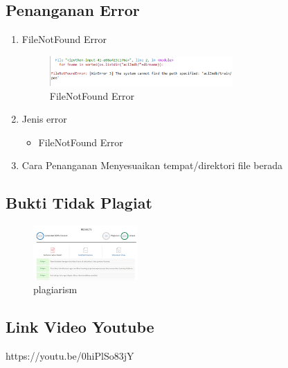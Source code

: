 \subsection{Penanganan Error}
\begin{enumerate}
	\item FileNotFound Error
	\hfill\break
		\begin{figure}[H]
			\includegraphics[width=7cm]{figures/1174084/5/error.png}
			\centering
			\caption{FileNotFound Error}
		\end{figure}
	\item Jenis error
	\begin{itemize}
		\item FileNotFound Error
	\end{itemize}
	\item Cara Penanganan
	\hfill\break
	Menyesuaikan tempat/direktori file berada
\end{enumerate}

\subsection{Bukti Tidak Plagiat}
\begin{figure}[H]
	\includegraphics[width=4cm]{figures/1174084/5/plagiarism.png}
	\centering
	\caption{plagiarism}
\end{figure}


\subsection{Link Video Youtube}
https://youtu.be/0hiPlSo83jY

